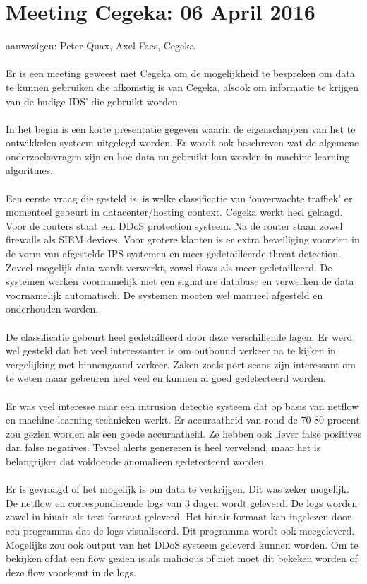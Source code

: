 \section{Meeting Cegeka: 06 April 2016}
aanwezigen: Peter Quax, Axel Faes, Cegeka\\\\
Er is een meeting geweest met Cegeka om de mogelijkheid te bespreken om data te kunnen gebruiken die afkomstig is van Cegeka, alsook om informatie te krijgen van de hudige IDS' die gebruikt worden. \\\\
In het begin is een korte presentatie gegeven waarin de eigenschappen van het te ontwikkelen systeem uitgelegd worden. Er wordt ook beschreven wat de algemene onderzoeksvragen zijn en hoe data nu gebruikt kan worden in machine learning algoritmes. \\\\
Een eerste vraag die gesteld is, is welke classificatie van ‘onverwachte traffiek’ er momenteel gebeurt in datacenter/hosting context. Cegeka werkt heel gelaagd. Voor de routers staat een DDoS protection systeem. Na de router staan zowel firewalls als SIEM devices. Voor grotere klanten is er extra beveiliging voorzien in de vorm van afgestelde IPS systemen en meer gedetailleerde threat detection. Zoveel mogelijk data wordt verwerkt, zowel flows als meer gedetailleerd. De systemen werken voornamelijk met een signature database en verwerken de data voornamelijk automatisch. De systemen moeten wel manueel afgesteld en onderhouden worden. \\\\
De classificatie gebeurt heel gedetailleerd door deze verschillende lagen. Er werd wel gesteld dat het veel interessanter is om outbound verkeer na te kijken in vergelijking met binnengaand verkeer. Zaken zoals port-scans zijn interessant om te weten maar gebeuren heel veel en kunnen al goed gedetecteerd worden. \\\\
Er was veel interesse naar een intrusion detectie systeem dat op basis van netflow en machine learning technieken werkt. Er accuraatheid van rond de 70-80 procent zou gezien worden als een goede accuraatheid. Ze hebben ook liever false positives dan false negatives. Teveel alerts genereren is heel vervelend, maar het is belangrijker dat voldoende anomalieen gedetecteerd worden. \\\\
Er is gevraagd of het mogelijk is om data te verkrijgen. Dit was zeker mogelijk. De netflow en corresponderende logs van 3 dagen wordt geleverd. De logs worden zowel in binair als text formaat geleverd. Het binair formaat kan ingelezen door een programma dat de logs visualiseerd. Dit programma wordt ook meegeleverd. Mogelijks zou ook output van het DDoS systeem geleverd kunnen worden. Om te bekijken ofdat een flow gezien is als malicious of niet moet dit bekeken worden of deze flow voorkomt in de logs.
